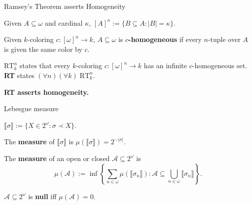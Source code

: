 \begin{frame}{Ramsey's Theorem asserts Homogeneity}
  \begin{notation*}
    Given $A\subseteq\omega$ and cardinal $\kappa$,
    $[A]^\kappa :=\{B\subseteq A:|B|=\kappa\}$.
  \end{notation*}
  \pause

  \begin{define*}[$c$-homogeneous]
    Given $k$-coloring $c:[\omega]^n\rightarrow k$, $A\subseteq\omega$ is
    \textbf{$c$-homogeneous} if every $n$-tuple over $A$ is given the same
    color by $c$.
  \end{define*}
  \pause

  \begin{thm*}[Ramsey's]
    \textbf{$\text{RT}_k^n$} states that every $k$-coloring
    $c:[\omega]^n\rightarrow k$ has an infinite $c$-homogeneous set.
    \textbf{RT} states $(\forall n)(\forall k)\; \text{RT}_k^n$.
  \end{thm*}
  \pause

  \vspace{0.5em}
  \textbf{RT asserts homogeneity.}
\end{frame}

\begin{frame}{Lebesgue measure}
  \begin{notation*}
    $\llbracket\sigma\rrbracket :=\{X\in2^\omega: \sigma\prec X\}$.
  \end{notation*}
  \pause

  \begin{define*}
    The \textbf{measure} of $\llbracket\sigma\rrbracket$ is
    $\mu(\llbracket\sigma\rrbracket) =2^{-|\sigma|}$.
  \end{define*}
  \pause

  \begin{define*}
    The \textbf{measure} of an open or closed
    $\mathcal{A}\subseteq2^\omega$ is
    \[\mu(\mathcal{A}):= \inf\left\{\sum_{n\in\omega}
    \mu(\llbracket\sigma_n\rrbracket): \mathcal{A}\subseteq
    \bigcup_{n\in\omega} \llbracket\sigma_n\rrbracket\right\}.\]
  \end{define*}
  \pause

  \begin{define*}
    $\mathcal{A}\subseteq2^\omega$ is \textbf{null} iff
    $\mu(\mathcal{A})=0$.
  \end{define*}
\end{frame}

